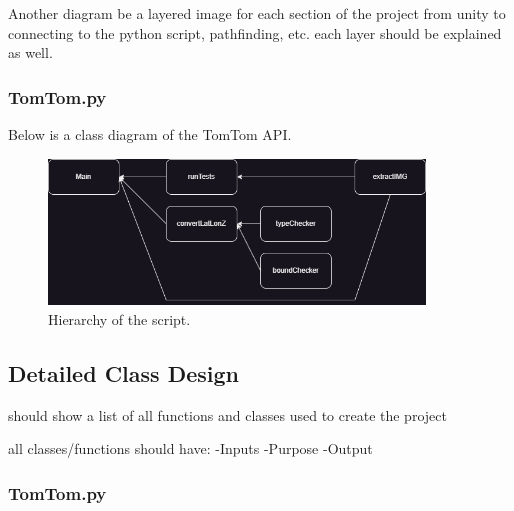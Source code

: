 Another diagram be a layered image for each section of the project from unity to connecting to the python script, pathfinding, etc. each layer should be explained as well.

\subsubsection{TomTom.py}

Below is a class diagram of the TomTom API.

\begin{figure}[htb]
    \centering
    \includegraphics[width=10cm]{Images/TomTomHier.png}
       \caption{Hierarchy of the script.}
           \label{Fig:TomTomHier}
\end{figure}

\newpage

\subsection{Detailed Class Design}

should show a list of all functions and classes used to create the project

all classes/functions should have:
-Inputs
-Purpose
-Output

\subsubsection{TomTom.py}

